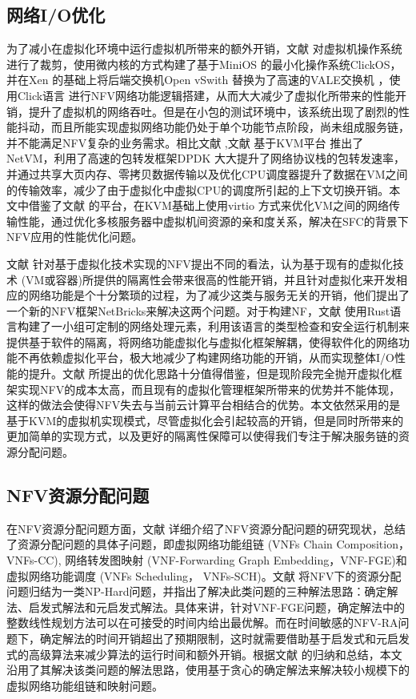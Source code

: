 \subsection{网络I/O优化}
为了减小在虚拟化环境中运行虚拟机所带来的额外开销，文献  对虚拟机操作系统进行了裁剪，使用微内核的方式构建了基于MiniOS \cite{popuri2014tour} 的最小化操作系统ClickOS，并在Xen \cite{barham2003xen} 的基础上将后端交换机Open vSwith \cite{pfaff2015design} 替换为了高速的VALE交换机 \cite{rizzo2012netmap} ，使用Click语言 \cite{kohler2000click} 进行NFV网络功能逻辑搭建，从而大大减少了虚拟化所带来的性能开销，提升了虚拟机的网络吞吐。但是在小包的测试环境中，该系统出现了剧烈的性能抖动，而且所能实现虚拟网络功能仍处于单个功能节点阶段，尚未组成服务链，并不能满足NFV复杂的业务需求。相比文献  ,文献  基于KVM平台 \cite{kivity2007kvm} 推出了NetVM，利用了高速的包转发框架DPDK \cite{intel2015data} 大大提升了网络协议栈的包转发速率，并通过共享大页内存、零拷贝数据传输以及优化CPU调度器提升了数据在VM之间的传输效率，减少了由于虚拟化中虚拟CPU的调度所引起的上下文切换开销。本文中借鉴了文献  的平台，在KVM基础上使用virtio \cite{russell2008virtio} 方式来优化VM之间的网络传输性能，通过优化多核服务器中虚拟机间资源的亲和度关系，解决在SFC的背景下NFV应用的性能优化问题。

文献  针对基于虚拟化技术实现的NFV提出不同的看法，认为基于现有的虚拟化技术 (VM或容器)所提供的隔离性会带来很高的性能开销，并且针对虚拟化来开发相应的网络功能是个十分繁琐的过程，为了减少这类与服务无关的开销，他们提出了一个新的NFV框架NetBricks来解决这两个问题。对于构建NF，文献  使用Rust语言构建了一小组可定制的网络处理元素，利用该语言的类型检查和安全运行机制来提供基于软件的隔离，将网络功能虚拟化与虚拟化框架解耦，使得软件化的网络功能不再依赖虚拟化平台，极大地减少了构建网络功能的开销，从而实现整体I/O性能的提升。文献  所提出的优化思路十分值得借鉴，但是现阶段完全抛开虚拟化框架实现NFV的成本太高，而且现有的虚拟化管理框架所带来的优势并不能体现，这样的做法会使得NFV失去与当前云计算平台相结合的优势。本文依然采用的是基于KVM的虚拟机实现模式，尽管虚拟化会引起较高的开销，但是同时所带来的更加简单的实现方式，以及更好的隔离性保障可以使得我们专注于解决服务链的资源分配问题。


\subsection{NFV资源分配问题}
在NFV资源分配问题方面，文献  详细介绍了NFV资源分配问题的研究现状，总结了资源分配问题的具体子问题，即虚拟网络功能组链 (VNFs Chain Composition，VNFs-CC), 网络转发图映射 (VNF-Forwarding Graph Embedding，VNF-FGE)和虚拟网络功能调度 (VNFs Scheduling， VNFs-SCH)。文献  将NFV下的资源分配问题归结为一类NP-Hard问题，并指出了解决此类问题的三种解法思路：确定解法、启发式解法和元启发式解法。具体来讲，针对VNF-FGE问题，确定解法中的整数线性规划方法可以在可接受的时间内给出最优解。而在时间敏感的NFV-RA问题下，确定解法的时间开销超出了预期限制，这时就需要借助基于启发式和元启发式的高级算法来减少算法的运行时间和额外开销。根据文献  的归纳和总结，本文沿用了其解决该类问题的解法思路，使用基于贪心的确定解法来解决较小规模下的虚拟网络功能组链和映射问题。

